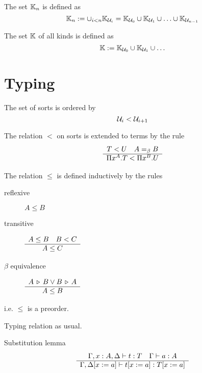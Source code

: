 \begin{definition}
  The set $\mathbb{K}_n$ is defined as
  $$
  \mathbb{K}_n :=
  \cup_{i < n} \mathbb{K}_{{\cal U}_i} =
  \mathbb{K}_{{\cal U}_0} \cup \mathbb{K}_{{\cal U}_1} \cup \ldots \cup \mathbb{K}_{{\cal U}_{n-1}}
  $$
\end{definition}


\begin{definition}
  The set $\mathbb{K}$ of all kinds is defined as
  $$
  \mathbb{K} := \mathbb{K}_{{\cal U}_0} \cup \mathbb{K}_{{\cal U}_1} \cup \ldots
  $$
\end{definition}




\section{Typing}

\begin{definition}
  The set of sorts is ordered by
  $$
  {\cal U}_i < {\cal U}_{i+1}
  $$
\end{definition}


\begin{definition}
  The relation $<$ on sorts is extended to terms by the rule
  $$
  \begin{array}{c} T < U \quad A =_\beta B \\ \hline \Pi x^A. T < \Pi x^B. U\end{array}
  $$
\end{definition}


\begin{definition}
  The relation $\le$ is defined inductively by the rules
  \begin{description}
  \item[reflexive] $A \le B$

  \item[transitive] $\begin{array}{c} A \le B \quad B < C \\ \hline A \le C\end{array}$

  \item[$\beta$ equivalence] $\begin{array}{c} A \,\triangleright\, B \lor B \,\triangleright\, A \\ \hline A \le B\end{array}$
  \end{description}
  i.e. $\le$ is a preorder.
\end{definition}

\begin{definition}
  Typing relation as usual.
\end{definition}



\begin{theorem}
  Substitution lemma \label{substitutionlemma}
  $$
  \begin{array}{c} \Gamma,x:A,\Delta \vdash t : T
    \quad
    \Gamma \vdash a: A
   \\ \hline \Gamma,\Delta[x:=a] \vdash t[x:=a] : T[x:=a]\end{array}
  $$
\end{theorem}



